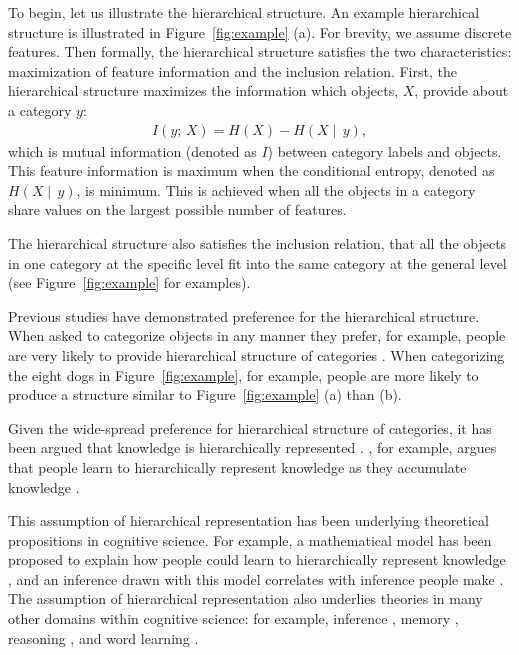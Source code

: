 \documentclass[doc]{apa6}
\begin{document}
To begin, let us illustrate the hierarchical structure.  An example hierarchical structure is
illustrated in Figure~\ref{fig:example} (a).  For brevity, we assume discrete features. Then
formally, the hierarchical structure satisfies the two characteristics: maximization of feature
information and the inclusion relation.  First, the hierarchical structure maximizes the information
which objects, $X$, provide about a category $y$:
\begin{align}
    I \left( y;\, X \right) = H \left( X \right) - H \left( X \middle\vert\, y \right),
\label{eqn:feature}
\end{align}
which is mutual information (denoted as $I$) between category labels and objects. This feature
information is maximum when the conditional entropy, denoted as $H \left( X \middle\vert\, y
\right)$, is minimum. This is achieved when all the objects in a category share values on the
largest possible number of features.

The hierarchical structure also satisfies the inclusion relation, that all the objects in one
category at the specific level fit into the same category at the general level (see
Figure~\ref{fig:example} for examples).

Previous studies have demonstrated preference for the hierarchical structure.  When asked
to categorize objects in any manner they prefer, for example, people are very likely to provide
hierarchical structure of categories \parencite[e.g.,][]{Rosch1976a}. When categorizing the eight
dogs in Figure~\ref{fig:example}, for example, people are more likely to produce a structure similar
to Figure~\ref{fig:example} (a) than (b).

Given the wide-spread preference for hierarchical structure of categories, it has been argued that
knowledge is hierarchically represented \parencite[e.g.,][]{Markman1984a, Markman1989a}.
\textcite{Markman1989a}, for example, argues that people learn to hierarchically represent knowledge
as they accumulate knowledge \parencite[see also][]{Vygotsky1962a, Inhelder1964a}.

This assumption of hierarchical representation has been underlying theoretical propositions in
cognitive science. For example, a mathematical model has been proposed to explain how people could
learn to hierarchically represent knowledge \parencite{Kemp2008a}, and an inference drawn with this
model correlates with inference people make \parencite{Kemp2009a}.  The assumption of hierarchical
representation also underlies theories in many other domains within cognitive science: for example,
inference \parencite{Osherson1990a}, memory \parencite{Bower1969a, Glass1975a}, reasoning
\parencite{Collins1989a, Shastri1993a}, and word learning \parencite{Xu2007a}.
\end{document}
